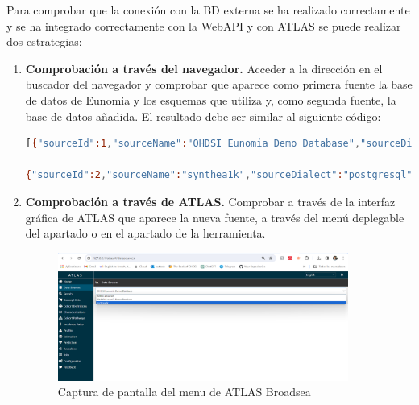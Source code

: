 Para comprobar que la conexión con la BD externa se ha realizado correctamente y se ha integrado correctamente con la WebAPI y con ATLAS se puede realizar dos estrategias:

\begin{enumerate}[label=\alph*]

    \item \textbf{Comprobación a través del navegador.} Acceder a la dirección  en el buscador del navegador y comprobar que aparece como primera fuente la base de datos de Eunomia y los esquemas que utiliza y, como segunda fuente, la base de datos añadida. El resultado debe ser similar al siguiente código:

\begin{lstlisting}[language=sh]
[{"sourceId":1,"sourceName":"OHDSI Eunomia Demo Database","sourceDialect":"postgresql","sourceKey":"EUNOMIA","daimons":[{"sourceDaimonId":1,"daimonType":"CDM","tableQualifier":"demo_cdm","priority":0},{"sourceDaimonId":3,"daimonType":"Results","tableQualifier":"demo_cdm_results","priority":0},{"sourceDaimonId":2,"daimonType":"Vocabulary","tableQualifier":"omop_vocab","priority":10}]},

{"sourceId":2,"sourceName":"synthea1k","sourceDialect":"postgresql","sourceKey":"SYNTHEA1K","daimons":[{"sourceDaimonId":4,"daimonType":"CDM","tableQualifier":"cdm\n","priority":1},{"sourceDaimonId":5,"daimonType":"Vocabulary","tableQualifier":"omop_vocab","priority":1},{"sourceDaimonId":6,"daimonType":"Results","tableQualifier":"cdm_results","priority":0}]}]
\end{lstlisting}

    \item \textbf{Comprobación a través de ATLAS.} Comprobar a través de la interfaz gráfica de ATLAS que aparece la nueva fuente, a través del menú deplegable del apartado  o en el apartado  de la herramienta.

\begin{figure}[H]
    \centering
    \includegraphics[width=0.90\textwidth]{figures/showDataSources.png}
    \caption{Captura de pantalla del menu  de ATLAS Broadsea}
    \label{fig:showDataSources}
\end{figure}


\end{enumerate}

